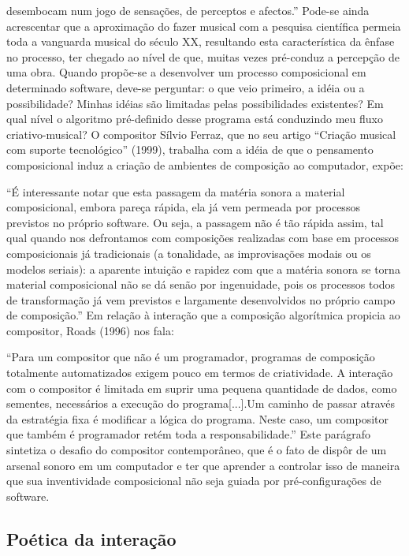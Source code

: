 \documentclass{ppgmus}
\begin{document}
desembocam num jogo de sensações, de perceptos e afectos.”
Pode-se ainda acrescentar que a aproximação do fazer musical com a pesquisa científica permeia toda 
a vanguarda musical do século XX, resultando esta característica da ênfase no processo, ter chegado 
ao nível de que, muitas vezes pré-conduz a percepção de uma obra.
Quando propõe-se a desenvolver um processo composicional em determinado software, deve-se perguntar: 
o que veio primeiro, a idéia ou a possibilidade? Minhas idéias são limitadas pelas possibilidades 
existentes? Em qual nível o algoritmo pré-definido desse programa está conduzindo meu fluxo 
criativo-musical? O compositor Sílvio Ferraz, que no seu artigo “Criação musical com suporte tecnológico” 
(1999), trabalha com a idéia de que o pensamento composicional induz a criação de ambientes de 
composição ao computador, expõe:

“É interessante notar que esta passagem da matéria sonora a material composicional, embora pareça rápida, 
ela já vem permeada por processos previstos no próprio software. Ou seja, a passagem não é tão rápida assim, 
tal qual quando nos defrontamos com composições realizadas com base em processos composicionais já 
tradicionais (a tonalidade, as improvisações modais ou os modelos seriais): a aparente intuição e 
rapidez com que a matéria sonora se torna material composicional não se dá senão por ingenuidade, 
pois os processos todos de transformação já vem previstos e largamente desenvolvidos no próprio campo 
de composição.”
Em relação à interação que a composição algorítmica propicia ao compositor, Roads (1996) nos fala:

“Para um compositor que não é um programador, programas de composição totalmente automatizados exigem 
pouco em termos de criatividade. A interação com o compositor é limitada em suprir uma pequena quantidade 
de dados, como sementes, necessários a execução do programa[...].Um caminho de passar através da estratégia 
fixa é modificar a lógica do programa. Neste caso, um compositor que também é programador retém toda a 
responsabilidade.”
Este parágrafo sintetiza o desafio do compositor contemporâneo, que é o fato de dispôr de um 
arsenal sonoro em um computador e ter que aprender a controlar isso de maneira que sua inventividade 
composicional não seja guiada por pré-configurações de software.


\subsection{Poética da interação}
\end{document}
